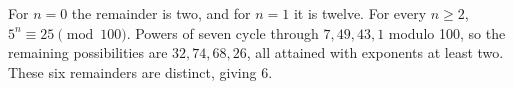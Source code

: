 For $n=0$ the remainder is two, and for $n=1$ it is twelve. For every $n\ge2$, $5^n\equiv25\pmod{100}$. Powers of seven cycle through $7,49,43,1$ modulo 100, so the remaining possibilities are $32,74,68,26$, all attained with exponents at least two. These six remainders are distinct, giving $\boxed6$.
